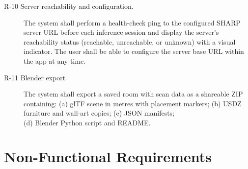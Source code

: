 \begin{description}
    \item [R-10 Server reachability and configuration.] The system shall perform a health-check ping to the configured SHARP server URL before each inference session and display the server's reachability status (reachable, unreachable, or unknown) with a visual indicator. The user shall be able to configure the server base URL within the app at any time.

    \item [R-11 Blender export] The system shall export a saved room with scan data as a shareable ZIP containing: (a) glTF scene in metres with placement markers; (b) USDZ furniture and wall-art copies; (c) JSON manifests;\\ (d) Blender Python script and README.

\end{description}

\section{Non-Functional Requirements}
\label{sec:nfr_req}

